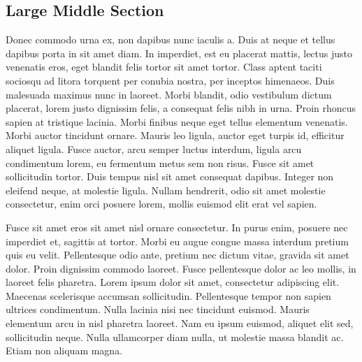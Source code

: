 \documentclass[twocolumn,10pt]{article}
\begin{document}
\subsection*{Large Middle Section}
Donec commodo urna ex, non dapibus nunc iaculis a. Duis\cite{texbook} at neque et tellus dapibus porta in sit amet diam. In imperdiet, est eu placerat mattis, lectus justo venenatis eros, eget blandit felis tortor sit amet tortor. Class aptent taciti sociosqu ad litora torquent per conubia nostra, per inceptos himenaeos. Duis malesuada maximus nunc in laoreet. Morbi blandit, odio vestibulum dictum placerat, lorem justo dignissim felis, a consequat felis nibh in urna. Proin rhoncus sapien at tristique lacinia. Morbi finibus neque eget tellus elementum venenatis. Morbi auctor tincidunt ornare. Mauris leo ligula, auctor eget turpis id, efficitur aliquet ligula. Fusce auctor, arcu semper luctus interdum, ligula arcu condimentum lorem, eu fermentum metus sem non risus. Fusce sit amet sollicitudin tortor. Duis tempus nisl sit amet consequat dapibus. Integer non eleifend neque, at molestie ligula. Nullam hendrerit, odio sit amet molestie consectetur, enim orci posuere lorem, mollis euismod elit erat vel sapien.

Fusce sit amet eros sit amet nisl ornare consectetur. In purus enim, posuere nec imperdiet et, sagittis at tortor. Morbi eu augue congue massa interdum pretium quis eu velit. Pellentesque odio ante, pretium nec dictum vitae, gravida sit amet dolor. Proin dignissim commodo laoreet. Fusce pellentesque dolor ac leo mollis, in laoreet felis pharetra. Lorem ipsum dolor sit amet, consectetur adipiscing elit. Maecenas scelerisque accumsan sollicitudin. Pellentesque tempor non sapien ultrices condimentum. Nulla lacinia nisi nec tincidunt euismod. Mauris elementum arcu in nisl pharetra laoreet. Nam eu ipsum euismod, aliquet elit sed, sollicitudin neque. Nulla ullamcorper diam nulla, ut molestie massa blandit ac. Etiam non aliquam magna. 

\onecolumn

\begin{bibliographyenv}
    
    
\end{bibliographyenv}
\end{document}
